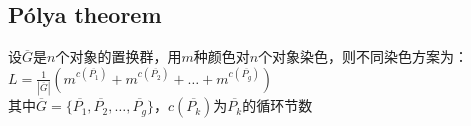 \subsection*{Pólya theorem}
    设$ \overline{G} $是$ n $个对象的置换群，用$ m $种颜色对$ n $个对象染色，则不同染色方案为：
    \\$ L = \frac{1}{\left| \overline{G} \right|} (m^{c(\overline{P_1})} + m^{c(\overline{P_2})} + \dots + m^{c(\overline{P_g})}) $
    \\其中$ \overline{G} = \lbrace \overline{P_1}, \overline{P_2}, \dots, \overline{P_g} \rbrace $，$ c(\overline{P_k}) $为$ \overline{P_k} $的循环节数
